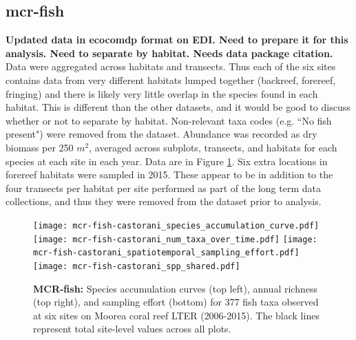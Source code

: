 \documentclass[11pt, oneside]{article}
\begin{document}
\subsection {mcr-fish}
{\bf Updated data in ecocomdp format on EDI. Need to prepare it for this analysis. Need to separate by habitat. Needs data package citation.}
Data were aggregated across habitats and transects.
Thus each of the six sites contains data from very different habitats lumped together (backreef, forereef, fringing) and there is likely very little overlap in the species found in each habitat. 
This is different than the other datasets, and it would be good to discuss whether or not to separate by habitat.
Non-relevant taxa codes (e.g. ``No fish present") were removed from the dataset.
Abundance was recorded as dry biomass per 250 $m^2$, averaged across subplots, transects, and habitats for each species at each site in each year.
Data are in Figure \ref{mcr-fish}.
Six extra locations in forereef habitats were sampled in 2015.
These appear to be in addition to the four transects per habitat per site performed as part of the long term data collections, and thus they were removed from the dataset prior to analysis.
\begin{figure}[h!]
\centering
\texttt{[image: mcr-fish-castorani\_species\_accumulation\_curve.pdf]}
\texttt{[image: mcr-fish-castorani\_num\_taxa\_over\_time.pdf]}
\texttt{[image: mcr-fish-castorani\_spatiotemporal\_sampling\_effort.pdf]}
\texttt{[image: mcr-fish-castorani\_spp\_shared.pdf]}
\caption{{\bf MCR-fish:} Species accumulation curves (top left),  annual richness (top right), and sampling effort (bottom)  for 377 fish taxa observed at six sites on Moorea coral reef LTER (2006-2015). The black lines represent total site-level values across all plots.}
\label{mcr-fish}
\end{figure}
\end{document}
